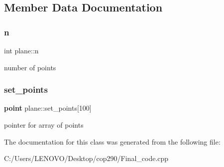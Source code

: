 \subsection{Member Data Documentation}
\mbox{\label{classplane_a8c3741be8ce131046bd198055057aa7d}} 
\subsubsection{n}
{\footnotesize\ttfamily int plane\+::n}

number of points \mbox{\label{classplane_aaa5dd201e484e171865c25412514bc54}} 
\subsubsection{set\+\_\+points}
{\footnotesize\ttfamily \textbf{ point} plane\+::set\+\_\+points[100]}

pointer for array of points 

The documentation for this class was generated from the following file\+:\begin{DoxyCompactItemize}
\item 
C\+:/\+Users/\+L\+E\+N\+O\+V\+O/\+Desktop/cop290/Final\+\_\+code.\+cpp\end{DoxyCompactItemize}
